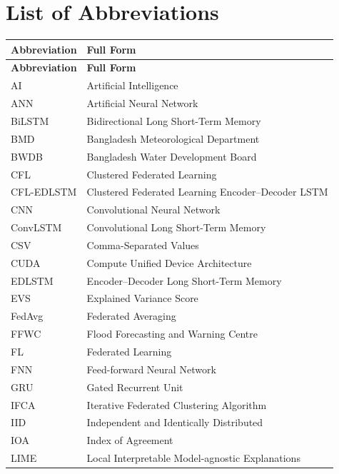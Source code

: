\chapter*{List of Abbreviations}

\begin{longtable}{@{}p{3.2cm} p{11cm}@{}}
\textbf{Abbreviation} & \textbf{Full Form} \\
\hline
\endfirsthead
\textbf{Abbreviation} & \textbf{Full Form} \\
\hline
\endhead
AI          & Artificial Intelligence \\
ANN         & Artificial Neural Network \\
BiLSTM      & Bidirectional Long Short-Term Memory \\
BMD         & Bangladesh Meteorological Department \\
BWDB        & Bangladesh Water Development Board \\
CFL         & Clustered Federated Learning \\
CFL-EDLSTM  & Clustered Federated Learning Encoder--Decoder LSTM \\
CNN         & Convolutional Neural Network \\
ConvLSTM    & Convolutional Long Short-Term Memory \\
CSV         & Comma-Separated Values \\
CUDA        & Compute Unified Device Architecture \\
EDLSTM      & Encoder--Decoder Long Short-Term Memory \\
EVS         & Explained Variance Score \\
FedAvg      & Federated Averaging \\
FFWC        & Flood Forecasting and Warning Centre \\
FL          & Federated Learning \\
FNN         & Feed-forward Neural Network \\
GRU         & Gated Recurrent Unit \\
IFCA        & Iterative Federated Clustering Algorithm \\
IID         & Independent and Identically Distributed \\
IOA         & Index of Agreement \\
LIME        & Local Interpretable Model-agnostic Explanations \\

\end{longtable}
